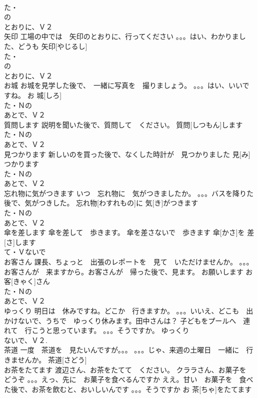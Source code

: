 \documentclass[8pt]{extreport}
\begin{document}
\begin{CJK}{UTF8}{min}
\\	た・
\\	の
\\	とおりに、Ｖ２
\\	矢印	工場の中では　矢印のとおりに、行ってください 。。。はい、わかりました、どうも	矢印[やじるし]			
\\	た・
\\	の
\\	とおりに、Ｖ２
\\	お城	お城を見学した後で、　一緒に写真を　撮りましょう。 。。。はい、いいですね。	お 城[しろ]			
\\	た・Ｎの
\\	あとで、Ｖ２
\\	質問します	説明を聞いた後で、質問して　ください。	質問[しつもん]します			
\\	た・Ｎの
\\	あとで、Ｖ２
\\	見つかります	新しいのを買った後で、なくした時計が　見つかりました	見[み]つかります			
\\	た・Ｎの
\\	あとで、Ｖ２
\\	忘れ物に気がつきます	いつ　忘れ物に　気がつきましたか。 。。。バスを降りた後で、気がつきした。	忘れ物[わすれもの]に 気[き]がつきます			
\\	た・Ｎの
\\	あとで、Ｖ２
\\	傘を差します	傘を差して　歩きます。 傘を差さないで　歩きます	傘[かさ]を 差[さ]します			
\\	て・Ｖないで　
\\	お客さん	課長、ちょっと　出張のレポートを　見て　いただけませんか。 。。。お客さんが　来ますから。お客さんが　帰った後で、見ます。 お願いします	お 客[きゃく]さん			
\\	た・Ｎの
\\	あとで、Ｖ２
\\	ゆっくり	明日は　休みですね。どこか　行きますか。 。。。いいえ、どこも　出かけないで、うちで　ゆっくり休みます。田中さんは？ 子どもをプールへ　連れて　行こうと思っています。 。。。そうですか。	ゆっくり			
\\	ないで、Ｖ２. 
\\	茶道	一度　茶道を　見たいんですが。。。 。。。じゃ、来週の土曜日　一緒に　行きませんか。	茶道[さどう]					
\\	お茶をたてます	渡辺さん、お茶をたてて　ください。 クララさん、お菓子を　どうぞ 。。。えっ、先に　お菓子を食べるんですか ええ。甘い　お菓子を　食べた後で、お茶を飲むと、おいしいんです 。。。そうですか	お 茶[ちゃ]をたてます			

\end{CJK}
\end{document}

